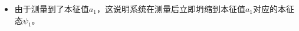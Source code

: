 \documentclass[a4paper,fontset=none]{ctexart}
\renewcommand\hbar\hslash
\renewcommand\geq\geqslant
\begin{document}
\begin{itemize}
\begin{align*}
        \end{align*}
        其中使用了：
        \[
            \int_{-\infty}^{+\infty} u^3 \mathrm{e}^{-u^2} \dd{u} = 0,\quad
            \int_{-\infty}^{+\infty} u^4 \mathrm{e}^{-u^2} \dd{u} = \frac{3\sqrt{\pi}}{4}
        \]
        于是有：
        \[
            \sigma_H^2 = \expval{H^2} - \expval{H}^2 = \frac{\hbar^4}{2m^2}\left(a^2 + 2al^2\right)
        \]
        则：
        \[
            \sigma_H^2 \sigma_x^2
            = \frac{\hbar^4}{2m^2}\left(a^2 + 2al^2\right) \cdot \left(\frac{1}{4a} + \frac{a\hbar^2 t^2}{m^2}\right)
            = \frac{\hbar^2}{4} \left(\frac{\hbar l}{m}\right)^2 \cdot \left(1 + \frac{a}{2l^2}\right) \left[1 + \left(\frac{2a\hbar t}{m}\right)^2\right]
        \]
        而：
        \[
            \sigma_H^2 \sigma_x^2
            \geq \frac{\hbar^2}{4} \left(\frac{\hbar l}{m}\right)^2
            = \frac{\hbar^2}{4} \dv{\expval{x}}{t}
        \]
        这符合能量——时间不确定度关系。

        \bigskip
        \item[33.(a)]
        由于测量到了本征值$a_1$，这说明系统在测量后立即坍缩到本征值$a_1$对应的本征态$\psi_1$。


\end{itemize}
\end{document}
